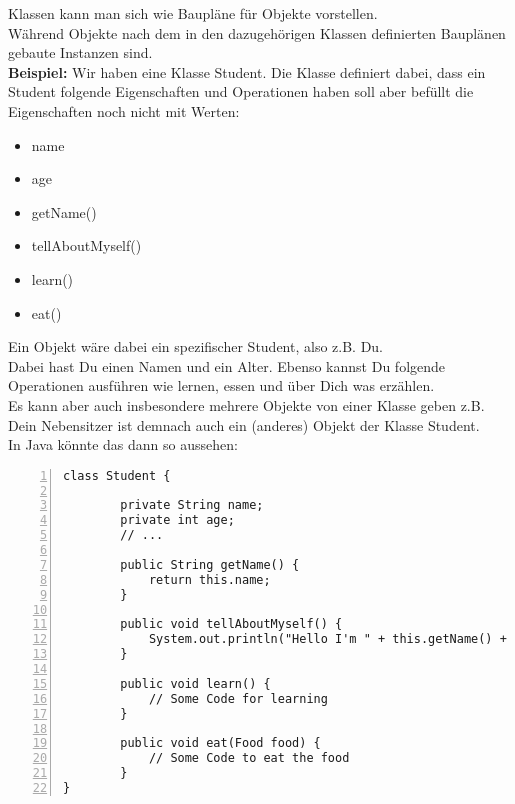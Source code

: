 


\begin{Infobox}
    Klassen kann man sich wie Baupläne für Objekte vorstellen.\\
    Während Objekte nach dem in den dazugehörigen Klassen definierten Bauplänen gebaute Instanzen sind.\\

    \textbf{Beispiel:} Wir haben eine Klasse Student.
    Die Klasse definiert dabei, dass ein Student folgende Eigenschaften und Operationen haben soll aber befüllt die Eigenschaften noch nicht mit Werten:

    \begin{itemize}
        \item name
        \item age
        \item getName()
        \item tellAboutMyself()
        \item learn()
        \item eat()
    \end{itemize}

    Ein Objekt wäre dabei ein spezifischer Student, also z.B. Du.\\
Dabei hast Du einen Namen und ein Alter.
Ebenso kannst Du folgende Operationen ausführen wie lernen, essen und über Dich was erzählen.\\
Es kann aber auch insbesondere mehrere Objekte von einer Klasse geben z.B. Dein Nebensitzer ist demnach auch ein (anderes) Objekt der Klasse Student.\\
In Java könnte das dann so aussehen:
    \begin{lstlisting}[numbers=left,xleftmargin=2em,frame=single,framexleftmargin=1.5em]
class Student {

        private String name;
        private int age;
        // ...

        public String getName() {
            return this.name;
        }

        public void tellAboutMyself() {
            System.out.println("Hello I'm " + this.getName() + ". I'm " + age + " old!";
        }

        public void learn() {
            // Some Code for learning
        }

        public void eat(Food food) {
            // Some Code to eat the food
        }
}

    \end{lstlisting}
\end{Infobox}

